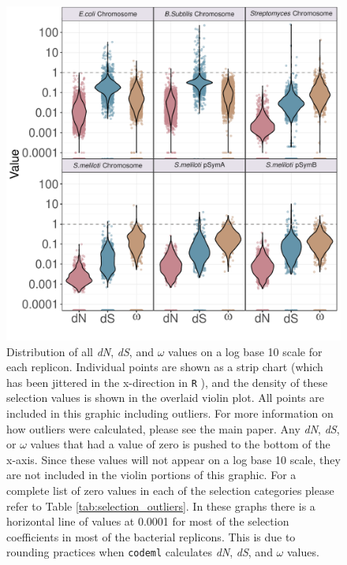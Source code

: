 \documentclass[11pt]{article}
\newcommand{\dn}{\textit{dN}\xspace}
\newcommand{\ds}{\textit{dS}\xspace}
\begin{document}
	\begin{figure}[h]
		\centering
		\includegraphics[width=\textwidth]{./figs/ALL_BAC_dN_dS_omega_violinplots_22Sep20.pdf}
		\caption{\label{fig:box_plots} Distribution of all \dn, \ds, and $\omega$ values on a log base 10 scale for each replicon. Individual points are shown as a strip chart (which has been jittered in the x-direction in \texttt{R} \citep{Wickham2019}), and the density of these selection values is shown in the overlaid violin plot. All points are included in this graphic including outliers. For more information on how outliers were calculated, please see the main paper. Any \dn, \ds, or $\omega$ values that had a value of zero is pushed to the bottom of the x-axis. Since these values will not appear on a log base 10 scale, they are not included in the violin portions of this graphic. For a complete list of zero values in each of the selection categories please refer to Table \ref{tab:selection_outliers}. In these graphs there is a horizontal line of values at 0.0001 for most of the selection coefficients in most of the bacterial replicons. This is due to rounding practices when \texttt{codeml} \citep{Yang97} calculates \dn, \ds, and $\omega$ values.}
	\end{figure}
\end{document}
